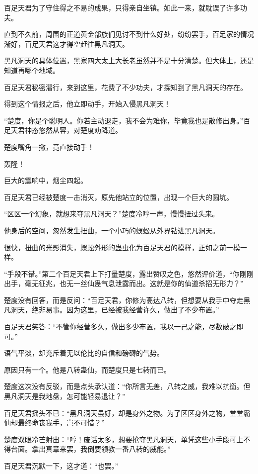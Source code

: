 \begin{this_body}
百足天君为了守住得之不易的成果，只得亲自坐镇。如此一来，就耽误了许多功夫。

直到不久前，周围的正道黄金部族们见讨不到什么好处，纷纷罢手，百足家的情况渐好，百足天君这才得空赶往黑凡洞天。

黑凡洞天的具体位置，黑家四大太上大长老虽然并不是十分清楚。但大体上，还是知道再哪个地域。

百足天君秘密潜行，来到这里，花费了不少功夫，才探知到了黑凡洞天的存在。

得到这个情报之后，他立即动手，开始入侵黑凡洞天！

“楚度，你是个聪明人。你若主动退走，我不会为难你，毕竟我也是散修出身。”百足天君神态悠然从容，对楚度劝降道。

楚度嘴角一撇，竟直接动手！

轰隆！

巨大的震响中，烟尘四起。

百足天君已经被楚度一击消灭，原先他站立的位置，出现一个巨大的圆坑。

“区区一个幻象，就想来夺黑凡洞天？”楚度冷哼一声，慢慢扭过头来。

他身后的空间，忽然发生扭曲，一个小巧的蜈蚣从外界钻进黑凡洞天。

很快，扭曲的光影消失，蜈蚣外形的蛊虫化为百足天君的模样，正如之前一模一样。

“手段不错。”第二个百足天君上下打量楚度，露出赞叹之色，悠然评价道，“你刚刚出手，毫无征兆，也无一丝仙蛊气息泄露而出。这就是你的仙道杀招无形力？”

楚度没有回答，而是反问：“百足天君，你修为高达八转，但想要从我手中夺走黑凡洞天，绝非易事。因为这里，已经被我经营许久，做出了不少布置。”

百足天君笑答：“不管你经营多久，做出多少布置，我以一己之能，尽数破之即可。”

语气平淡，却充斥着无以伦比的自信和磅礴的气势。

原因只有一个。他是八转蛊仙，而楚度只是七转而已。

楚度这次没有反驳，而是点头承认道：“你所言无差，八转之威，我难以抗衡。但黑凡洞天是我地盘，怎可能轻易退让？”

百足天君摇头不已：“黑凡洞天虽好，却是身外之物。为了区区身外之物，堂堂霸仙却最终命丧我手，岂不可惜？”

楚度双眼冷芒射出：“哼！废话太多，想要抢夺黑凡洞天，单凭这些小手段可上不得台面。拿出真章来罢，我倒要领教一番八转的威能。”

百足天君沉默一下，这才道：“也罢。”


\end{this_body}
